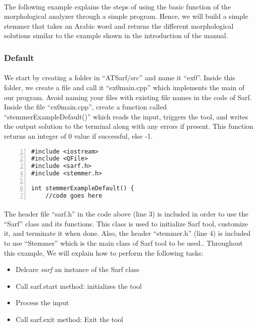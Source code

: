 \documentclass{article}
\begin{document}
\paragraph{}
The following example explains the steps of using the basic function of the morphological analyzer through a simple program. Hence, we will build a simple stemmer that takes an Arabic word and returns the different morphological solutions similar to the example shown in the introduction of the manual.

\subsubsection{Default}
\label{subsubsec:default}

\paragraph{}
We start by creating a folder in ``ATSarf/src'' and name it ``ex0''. Inside this folder, we create a file and call it ``ex0main.cpp'' which implements the main of our program. Avoid naming your files with existing file names in the code of Sarf. Inside the file ``ex0main.cpp'', create a function called ``stemmerExampleDefault()'' which reads the input, triggers the tool, and writes the output solution to the terminal along with any errors if present. This function returns an integer of 0 value if successful, else -1.

\begin{Verbatim}[numbers=left]
#include <iostream>
#include <QFile>
#include <sarf.h>
#include <stemmer.h>

int stemmerExampleDefault() {
	//code goes here
\end{Verbatim}

\paragraph{}
The header file ``sarf.h'' in the code above (line 3) is included in order to use the ``Sarf'' class and its functions. This class is used to initialize Sarf tool, customize it, and terminate it when done. Also, the header ``stemmer.h'' (line 4) is included to use ``Stemmer'' which is the main class of Sarf tool to be used.. Throughout this example, We will explain how to perform the following tasks:

\begin{itemize}
\item Delcare {\em sarf}  an instance of the Sarf class
\item Call {sarf.start } method: initializes the tool
\item Process the input
\item Call {sarf.exit } method: Exit the tool
\end{itemize}
\end{document}
